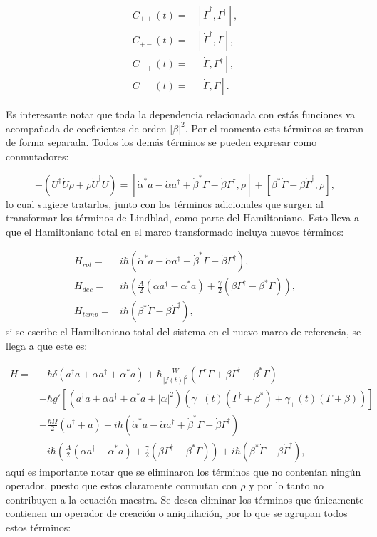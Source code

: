 \documentclass[a4paper,10pt]{report}
\begin{document}
\begin{align*}
C_{++}(t) =& [\dot{\Gamma}^{\dagger}, \Gamma^{\dagger}],\\
C_{+-}(t) =& [\dot{\Gamma}^{\dagger}, \Gamma],\\
C_{-+}(t) =& [\dot{\Gamma}, \Gamma^{\dagger}],\\
C_{--}(t) =& [\dot{\Gamma}, \Gamma].
\end{align*} 
 
Es interesante notar que toda la dependencia relacionada con estás funciones va acompañada de coeficientes de orden $|\beta|^2$. Por el momento ests términos se traran de forma separada. Todos los demás términos se pueden expresar como conmutadores:

\begin{equation}
-(U^{\dagger}\dot{U}\rho + \rho \dot{U}^\dagger U) = [\dot{\alpha}^*a-\dot{\alpha}a^\dagger+\dot{\beta}^*\Gamma-\dot{\beta}\Gamma^\dagger,\rho]+ [\beta^*\dot{\Gamma} - \beta \dot{\Gamma}^\dagger,\rho],
\end{equation} lo cual sugiere tratarlos, junto con los términos adicionales que surgen al transformar los términos de Lindblad, como parte del Hamiltoniano. Esto lleva a que el Hamiltoniano total en el marco transformado incluya nuevos términos:

\begin{align}
H_{rot} =& i\hbar(\dot{\alpha}^*a-\dot{\alpha}a^\dagger+\dot{\beta}^*\Gamma-\dot{\beta}\Gamma^\dagger),\\
H_{dec} =& i\hbar(\frac{A}{2}(\alpha a^\dagger - \alpha^*a)+\frac{\gamma}{2}(\beta\Gamma^{\dagger}-\beta^* \Gamma)),\\
H_{temp}=& i\hbar(\beta^*\dot{\Gamma} - \beta \dot{\Gamma}^\dagger),
\end{align} si se escribe el Hamiltoniano total del sistema en el nuevo marco de referencia, se llega a que este es:

\begin{align*}
H =& -\hbar \delta(a^{\dagger}a +\alpha a^{\dagger}+\alpha^* a)+\hbar\frac{W}{|f(t)|^2}(\Gamma^{\dagger}\Gamma + \beta \Gamma^{\dagger} + \beta^* \Gamma)\\
 &-\hbar g'[(a^{\dagger}a +\alpha a^{\dagger}+\alpha^* a + |\alpha|^2)(\gamma_-(t)(\Gamma^{\dagger}+\beta^*)+\gamma_+(t)(\Gamma+\beta))]\\
 &+\frac{\hbar \Omega}{2}(a^{\dagger} + a)+i\hbar(\dot{\alpha}^*a-\dot{\alpha}a^\dagger+\dot{\beta}^*\Gamma-\dot{\beta}\Gamma^\dagger)\\
 &+i\hbar(\frac{A}{2}(\alpha a^\dagger - \alpha^*a)+\frac{\gamma}{2}(\beta\Gamma^{\dagger}-\beta^* \Gamma))+i\hbar(\beta^*\dot{\Gamma} - \beta \dot{\Gamma}^\dagger),
\end{align*} aquí es importante notar que se eliminaron los términos que no contenían ningún operador, puesto que estos claramente conmutan con $\rho$ y por lo tanto no contribuyen a la ecuación maestra. Se desea eliminar los términos que únicamente contienen un operador de creación o aniquilación, por lo que se agrupan todos estos términos: 
\end{document}

